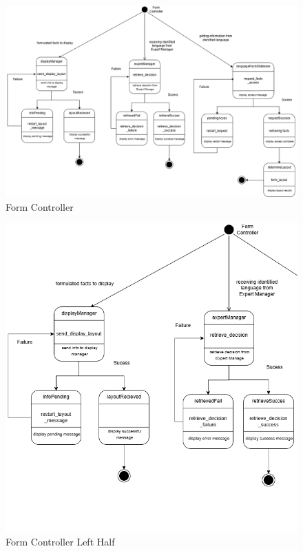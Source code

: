 \begin{figure}[H]
	\centering
	\includegraphics[width=\textwidth, height=\textheight, keepaspectratio]{Section2/images/Form_Controller_state_diagramV2.png}
	\caption{Form Controller}
	\label{FormController}
\end{figure}

\begin{figure}[H]
	\centering
	\includegraphics[width=\textwidth, height=0.95\textheight, keepaspectratio]{Section2/images/Form_Controller_state_diagramV2_left_half.png}
	\caption{Form Controller Left Half}
	\label{FormController}
\end{figure}

